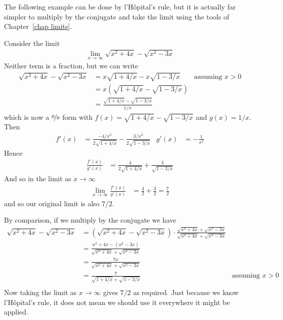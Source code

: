 \begin{enumerate}[(a)]
The following example can be done by l'H\^opital's rule, but it is actually far simpler
to multiply by the conjugate and take the limit using the tools of
Chapter~\ref{chap limits}.
\begin{eg}\label{eg_3_7_5}
Consider the limit
\begin{align*}
  \lim_{x\to \infty} \sqrt{x^2+4x}-\sqrt{x^2-3x}
\end{align*}
Neither term is a fraction, but we can write
\begin{align*}
\sqrt{x^2+4x}-\sqrt{x^2-3x}
&= x\sqrt{1+4/x}-x\sqrt{1-3/x}  & \text{assuming $x>0$}\\
&= x \left( \sqrt{1+4/x}-\sqrt{1-3/x} \right)\\
&= \frac{\sqrt{1+4/x}-\sqrt{1-3/x}}{1/x}
\end{align*}
which is now a $\nicefrac00$ form with $f(x)=\sqrt{1+4/x}-\sqrt{1-3/x}$ and $g(x)=1/x$.
Then
\begin{align*}
f'(x) &= \frac{-4/x^2}{2\sqrt{1+4/x}} - \frac{3/x^2}{2\sqrt{1-3/x}} &
g'(x) &= - \frac{1}{x^2}
\end{align*}
Hence
\begin{align*}
  \frac{f'(x)}{g'(x)} &= \frac{4}{2\sqrt{1+4/x}} + \frac{3}{\sqrt{1-3/x}}
\end{align*}
And so in the limit as $x\to \infty$
\begin{align*}
  \lim_{x\to \infty} \frac{f'(x)}{g'(x)} &= \frac{4}{2}+\frac{3}{2} =
\frac{7}{2}
\end{align*}
and so our original limit is also $7/2$.

By comparison, if we multiply by the conjugate we have
\begin{align*}
\sqrt{x^2+4x}-\sqrt{x^2-3x}
&= \left( \sqrt{x^2+4x}-\sqrt{x^2-3x}\right)
\cdot \frac{\sqrt{x^2+4x}+\sqrt{x^2-3x}}{\sqrt{x^2+4x}+\sqrt{x^2-3x}}\\
&= \frac{ x^2+4x - (x^2-3x)}{\sqrt{x^2+4x}+\sqrt{x^2-3x}}\\
&= \frac{ 7x}{\sqrt{x^2+4x}+\sqrt{x^2-3x}}\\
&= \frac{7}{\sqrt{1+4/x}+\sqrt{1-3/x}} & \text{assuming $x>0$}\\
\end{align*}
Now taking the limit as $x\to\infty$ gives $7/2$ as required. Just because we know
l'H\^opital's rule, it does not mean we should use it everywhere it might be applied.
\end{eg}



\goodbreak



\end{enumerate}
